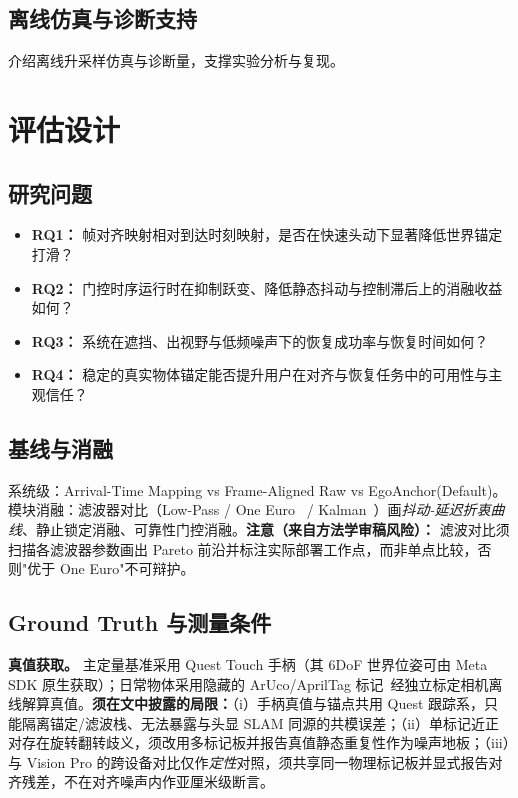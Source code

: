 \documentclass[review]{vgtc}
\begin{document}
\subsection{离线仿真与诊断支持}
介绍离线升采样仿真与诊断量，支撑实验分析与复现。

\section{评估设计}

\subsection{研究问题}
\begin{itemize}[leftmargin=1.4em]
  \item \textbf{RQ1：} 帧对齐映射相对到达时刻映射，是否在快速头动下显著降低世界锚定打滑？
  \item \textbf{RQ2：} 门控时序运行时在抑制跃变、降低静态抖动与控制滞后上的消融收益如何？
  \item \textbf{RQ3：} 系统在遮挡、出视野与低频噪声下的恢复成功率与恢复时间如何？
  \item \textbf{RQ4：} 稳定的真实物体锚定能否提升用户在对齐与恢复任务中的可用性与主观信任？
\end{itemize}

\subsection{基线与消融}
系统级：Arrival-Time Mapping vs Frame-Aligned Raw vs EgoAnchor(Default)。模块消融：滤波器对比（Low-Pass / One Euro~\cite{casiez2012oneeuro} / Kalman~\cite{kalman1960new}）画\emph{抖动-延迟折衷曲线}、静止锁定消融、可靠性门控消融。\textbf{注意（来自方法学审稿风险）：} 滤波对比须扫描各滤波器参数画出 Pareto 前沿并标注实际部署工作点，而非单点比较，否则"优于 One Euro"不可辩护。

\subsection{Ground Truth 与测量条件}
\noindent\textbf{真值获取。} 主定量基准采用 Quest Touch 手柄（其 6DoF 世界位姿可由 Meta SDK 原生获取）；日常物体采用隐藏的 ArUco/AprilTag 标记~\cite{olson2011apriltag,garridojurado2014aruco}经独立标定相机离线解算真值。\textbf{须在文中披露的局限：}（i）手柄真值与锚点共用 Quest 跟踪系，只能隔离锚定/滤波栈、无法暴露与头显 SLAM 同源的共模误差；（ii）单标记近正对存在旋转翻转歧义，须改用多标记板并报告真值静态重复性作为噪声地板；（iii）与 Vision Pro 的跨设备对比仅作\emph{定性}对照，须共享同一物理标记板并显式报告对齐残差，不在对齐噪声内作亚厘米级断言。
\end{document}
